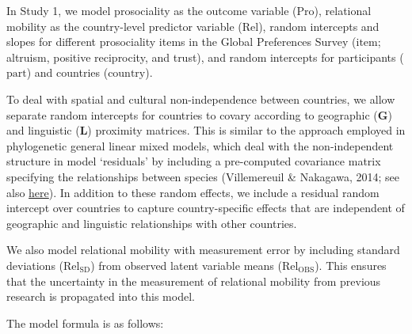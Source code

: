 \documentclass[
  man,floatsintext]{apa6}
\begin{document}
In Study 1, we model prosociality as the outcome variable (\(\text{Pro}\)), relational mobility as the country-level predictor variable (\(\text{Rel}\)), random intercepts and slopes for different prosociality items in the Global Preferences Survey (\(\text{item}\); altruism, positive reciprocity, and trust), and random intercepts for participants (\(\text{part}\)) and countries (\(\text{country}\)).

To deal with spatial and cultural non-independence between countries, we allow separate random intercepts for countries to covary according to geographic (\(\textbf{G}\)) and linguistic (\(\textbf{L}\)) proximity matrices. This is similar to the approach employed in phylogenetic general linear mixed models, which deal with the non-independent structure in model `residuals' by including a pre-computed covariance matrix specifying the relationships between species (Villemereuil \& Nakagawa, 2014; see also \href{https://cran.r-project.org/web/packages/brms/vignettes/brms_phylogenetics.html}{here}). In addition to these random effects, we include a residual random intercept over countries to capture country-specific effects that are independent of geographic and linguistic relationships with other countries.

We also model relational mobility with measurement error by including standard deviations (\(\text{Rel}_{\text{SD}}\)) from observed latent variable means (\(\text{Rel}_{\text{OBS}}\)). This ensures that the uncertainty in the measurement of relational mobility from previous research is propagated into this model.

The model formula is as follows:
\end{document}
